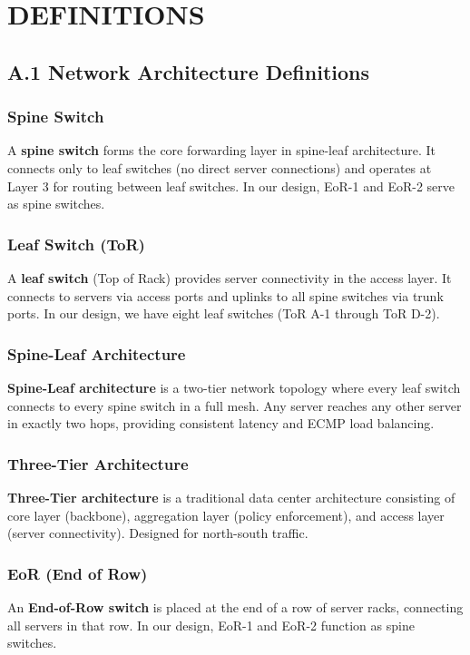 \chapter{DEFINITIONS}
\label{app:definitions}

\section*{A.1 Network Architecture Definitions}

\subsection*{Spine Switch}
\label{def:spine}
A \textbf{spine switch} forms the core forwarding layer in spine-leaf architecture. 
It connects only to leaf switches (no direct server connections) and operates 
at Layer 3 for routing between leaf switches. In our design, EoR-1 and EoR-2 
serve as spine switches.

\subsection*{Leaf Switch (ToR)}
\label{def:leaf}
A \textbf{leaf switch} (Top of Rack) provides server connectivity in the access 
layer. It connects to servers via access ports and uplinks to all spine switches 
via trunk ports. In our design, we have eight leaf switches (ToR A-1 through 
ToR D-2).

\subsection*{Spine-Leaf Architecture}
\label{def:spineleaf}
\textbf{Spine-Leaf architecture} is a two-tier network topology where every 
leaf switch connects to every spine switch in a full mesh. Any server reaches 
any other server in exactly two hops, providing consistent latency and ECMP 
load balancing.

\subsection*{Three-Tier Architecture}
\label{def:threetier}
\textbf{Three-Tier architecture} is a traditional data center architecture 
consisting of core layer (backbone), aggregation layer (policy enforcement), 
and access layer (server connectivity). Designed for north-south traffic.

\subsection*{EoR (End of Row)}
\label{def:eor}
An \textbf{End-of-Row switch} is placed at the end of a row of server racks, 
connecting all servers in that row. In our design, EoR-1 and EoR-2 function as 
spine switches.

